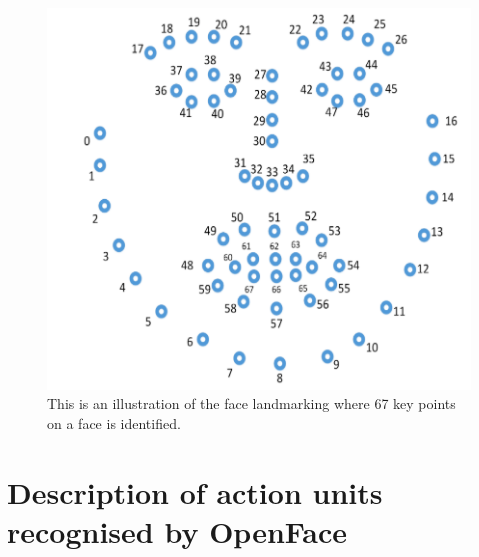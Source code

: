 \documentclass{monashthesis}
\begin{document}
\begin{figure}

{\centering \includegraphics[width=1\linewidth]{figures/landmarking} 

}

\caption{This is an illustration of the face landmarking where 67 key points on a face is identified. }\label{fig:landmarking}
\end{figure}

\hypertarget{description-of-action-units-recognised-by-openface}{%
\section{Description of action units recognised by OpenFace}\label{description-of-action-units-recognised-by-openface}}
\end{document}
